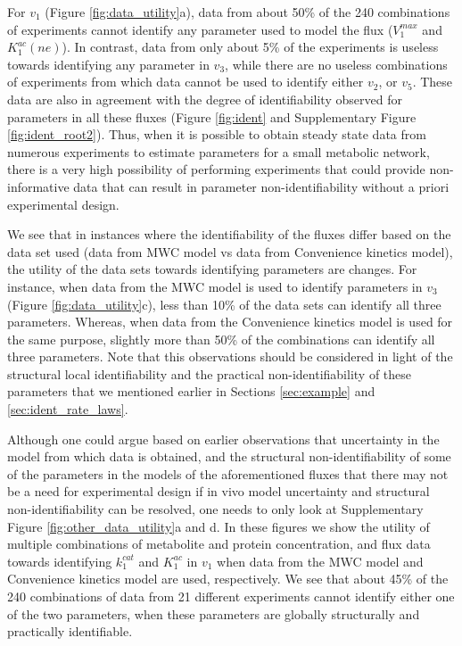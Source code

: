 \documentclass[10pt]{article}
\begin{document}
	For $v_1$ (Figure \ref{fig:data_utility}a), data from about 50\% of the 240 combinations of experiments cannot identify any parameter used to model the flux ($V_1^{max}$ and $K_1^{ac}(ne)$). In contrast, data from only about 5\% of the experiments is useless towards identifying any parameter in $v_3$, while there are no useless combinations of experiments from which data cannot be used to identify either $v_2$, or $v_5$. These data are also in agreement with the degree of identifiability observed for parameters in all these fluxes (Figure \ref{fig:ident} and Supplementary Figure \ref{fig:ident_root2}). Thus, when it is possible to obtain steady state data from numerous experiments to estimate parameters for a small metabolic network, there is a very high possibility of performing experiments that could provide non-informative data that can result in parameter non-identifiability without a priori experimental design.
	
	We see that in instances where the identifiability of the fluxes differ based on the data set used (data from MWC model vs data from Convenience kinetics model), the utility of the data sets towards identifying parameters are changes. For instance, when data from the MWC model is used to identify parameters in $v_3$ (Figure \ref{fig:data_utility}c), less than 10\% of the data sets can identify all three parameters. Whereas, when data from the Convenience kinetics model is used for the same purpose, slightly more than 50\% of the combinations can identify all three parameters. Note that this observations should be considered in light of the structural local identifiability and the practical non-identifiability of these parameters that we mentioned earlier in Sections \ref{sec:example} and \ref{sec:ident_rate_laws}. 
	
	Although one could argue based on earlier observations that uncertainty in the model from which data is obtained, and the structural non-identifiability of some of the parameters in the models of the aforementioned fluxes that there may not be a need for experimental design if in vivo model uncertainty and structural non-identifiability can be resolved, one needs to only look at Supplementary Figure \ref{fig:other_data_utility}a and d. In these figures we show the utility of multiple combinations of metabolite and protein concentration, and flux data towards identifying $k_1^{cat}$ and $K_1^{ac}$ in $v_1$ when data from the MWC model and Convenience kinetics model are used, respectively. We see that about 45\% of the 240 combinations of data from 21 different experiments cannot identify either one of the two parameters, when these parameters are globally structurally and practically identifiable. 
	
\end{document}

